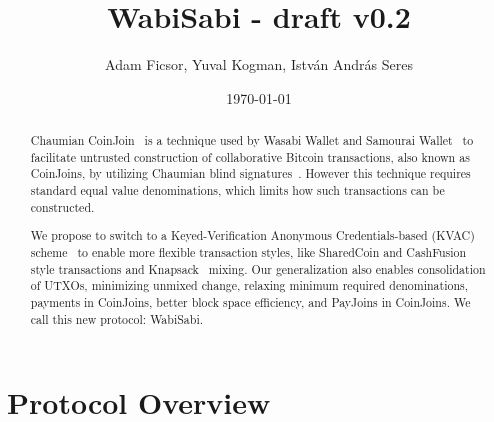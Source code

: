 \documentclass{article}
\title{WabiSabi - draft v0.2}
\author{Adam Ficsor, Yuval Kogman, István András Seres}
\date{\today}
\begin{document}
\maketitle

\begin{abstract}


Chaumian CoinJoin~\cite{mizrahi2013blind}\cite{maxwell2013coinjoin} is a technique used by Wasabi Wallet and Samourai Wallet~\cite{zerolink} to facilitate untrusted construction of collaborative Bitcoin transactions, also known as CoinJoins, by utilizing Chaumian blind signatures~\cite{chaum1983blind}. However this technique requires standard equal value denominations, which limits how such transactions can be constructed.

We propose to switch to a Keyed-Verification Anonymous Credentials-based (KVAC) scheme~\cite{chase2019signal} to enable more flexible transaction styles, like SharedCoin and CashFusion~\cite{cashfusion} style transactions and Knapsack~\cite{maurer2017anonymous} mixing. Our generalization also enables consolidation of UTXOs, minimizing unmixed change, relaxing minimum required denominations, payments in CoinJoins, better block space efficiency, and PayJoins in CoinJoins. We call this new protocol: WabiSabi.

\end{abstract}




\section{Protocol Overview}
\end{document}
